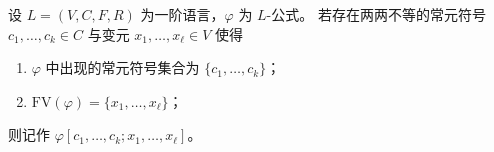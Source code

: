 \documentclass[lang=cn,a4paper,newtx,section]{elegantbook}
\begin{document}
 
 
 
 
 
 
 
 
 
 
  
 \begin{definition}[公式的语境]
 \label{formula-context}
 设 $L=(V,C,F,R)$ 为一阶语言，$\varphi$ 为 $L$-公式。
 若存在两两不等的常元符号 $c_1,\dots,c_k\in C$ 与变元 $x_1,\dots,x_{\ell}\in V$ 使得
 \begin{enumerate}
   \item $\varphi$ 中出现的常元符号集合为 $\{c_1,\dots,c_k\}$；
   \item $\mathrm{FV}(\varphi)=\{x_1,\dots,x_{\ell}\}$；
 \end{enumerate}
 则记作 $\varphi[c_1,\dots,c_k; x_1,\dots,x_{\ell}]$。
 \end{definition}
\end{document}
